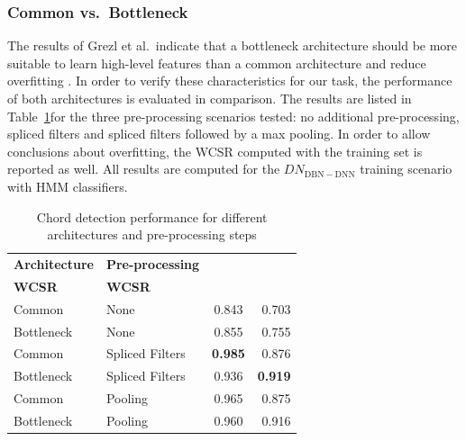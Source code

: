\documentclass{article}
\begin{document}
\subsubsection{Common vs.\ Bottleneck}
The results of Grezl et al.\ indicate that a bottleneck architecture should be more suitable to learn high-level features than a common architecture and reduce overfitting \cite{grezl2007probabilistic}. In order to verify these characteristics for our task, the performance of both architectures is evaluated in comparison. The results are listed in Table~\ref{tab:arch}for the three pre-processing scenarios tested: no additional pre-processing, spliced filters and spliced filters followed by a max pooling. In order to allow conclusions about overfitting, the WCSR computed with the training set is reported as well.
All results are computed for the $DN_\mathrm{DBN-DNN}$ training scenario with HMM classifiers.

\begin{table}
\centering
\begin{tabular*}{\columnwidth}{@{\extracolsep{\fill}}llcr}
\toprule
\textbf{Architecture}                   & \textbf{Pre-processing}                      & \begin{tabular}[c]{@{}c@{}}\textbf{Training}\\ \textbf{WCSR}\end{tabular} & \textbf{WCSR}  \\ \midrule
Common                         & None                                & 0.843                                                      & 0.703 \\
Bottleneck                     & None                                & 0.855                                                      & 0.755 \\
Common     & Spliced Filters & \textbf{0.985} & 0.876 \\
Bottleneck & Spliced Filters & 0.936 & \textbf{0.919} \\ 
Common & Pooling & 0.965 & 0.875 \\ 
Bottleneck & Pooling & 0.960 & 0.916 \\ \bottomrule
\end{tabular*}
\caption{Chord detection performance for different architectures and pre-processing steps}
\label{tab:arch}
\end{table}
\end{document}
